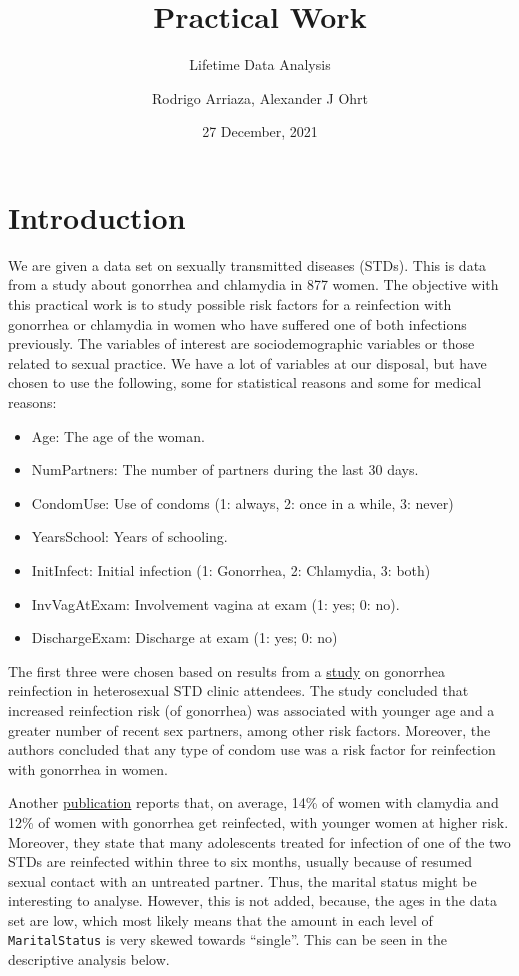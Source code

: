 \documentclass[
]{article}
\title{Practical Work}
\subtitle{Lifetime Data Analysis}
\author{Rodrigo Arriaza, Alexander J Ohrt}
\date{27 December, 2021}
\providecommand{\tightlist}{%
  \setlength{\itemsep}{0pt}\setlength{\parskip}{0pt}}
\begin{document}
\maketitle

\hypertarget{introduction}{%
\section{Introduction}\label{introduction}}

We are given a data set on sexually transmitted diseases (STDs). This is data from a study about gonorrhea and chlamydia in 877 women. The objective with this practical work is to study possible risk factors for a reinfection with gonorrhea or chlamydia in women who have suffered one of both infections previously. The variables of interest are sociodemographic variables or those related to sexual practice. We have a lot of variables at our disposal, but have chosen to use the following, some for statistical reasons and some for medical reasons:

\begin{itemize}
\tightlist
\item
  Age: The age of the woman.
\item
  NumPartners: The number of partners during the last 30 days.
\item
  CondomUse: Use of condoms (1: always, 2: once in a while, 3: never)
\item
  YearsSchool: Years of schooling.
\item
  InitInfect: Initial infection (1: Gonorrhea, 2: Chlamydia, 3: both)
\item
  InvVagAtExam: Involvement vagina at exam (1: yes; 0: no).
\item
  DischargeExam: Discharge at exam (1: yes; 0: no)
\end{itemize}

The first three were chosen based on results from a \href{https://www.ncbi.nlm.nih.gov/pmc/articles/PMC1744639/}{study} on gonorrhea reinfection in heterosexual STD clinic attendees. The study concluded that increased reinfection risk (of gonorrhea) was associated with younger age and a greater number of recent sex partners, among other risk factors. Moreover, the authors concluded that any type of condom use was a risk factor for reinfection with gonorrhea in women.

Another \href{https://policylab.chop.edu/sites/default/files/pdf/publications/Preventing_Chlamydia_Gonorrhea_Reinfection_through_Increased_Use_of_EPT.pdf}{publication} reports that, on average, 14\% of women with clamydia and 12\% of women with gonorrhea get reinfected, with younger women at higher risk. Moreover, they state that many adolescents treated for infection of one of the two STDs are reinfected within three to six months, usually because of resumed sexual contact with an untreated partner. Thus, the marital status might be interesting to analyse. However, this is not added, because, the ages in the data set are low, which most likely means that the amount in each level of \texttt{MaritalStatus} is very skewed towards ``single''. This can be seen in the descriptive analysis below.
\end{document}
